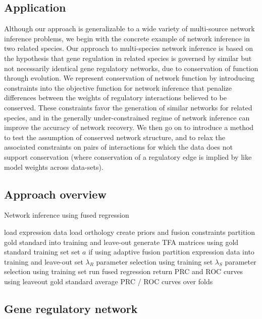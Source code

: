 \documentclass[11pt]{article}
\begin{document}
\subsection{Application}
Although our approach is generalizable to a wide variety of multi-source network inference problems, we begin with the concrete example of network inference in two related species. 
Our approach to multi-species network inference is based on the hypothesis that gene regulation in related species is governed by similar but not necessarily identical gene regulatory networks, due to conservation of function through evolution. 
We represent conservation of network function by introducing constraints into the objective function for network inference that penalize differences between the weights of regulatory interactions believed to be conserved. 
These constraints favor the generation of similar networks for related species, and in the generally under-constrained regime of network inference can improve the accuracy of network recovery. 
We then go on to introduce a method to test the assumption of conserved network structure, and to relax the associated constraints on pairs of interactions for which the data does not support conservation (where conservation of a regulatory edge is implied by like model weights across data-sets).


\subsection{Approach overview}
\begin{algorithm}
	\caption{Network inference using fused regression}\label{euclid}
	\begin{algorithmic}
\State load expression data
\State load orthology
\State create priors and fusion constraints
\State partition gold standard into training and leave-out
\State generate TFA matrices using gold standard training set
\State set $a$ if using adaptive fusion
	\State partition expression data into training and leave-out set
	\State $\lambda_R$ parameter selection using training set
	\State $\lambda_S$ parameter selection using training set
	\State run fused regression
	\State return PRC and ROC curves using leaveout gold standard
	\EndFor
\State average PRC / ROC curves over folds
\EndProcedure
\end{algorithmic}
\end{algorithm}


\subsection{Gene regulatory network}
\end{document}
